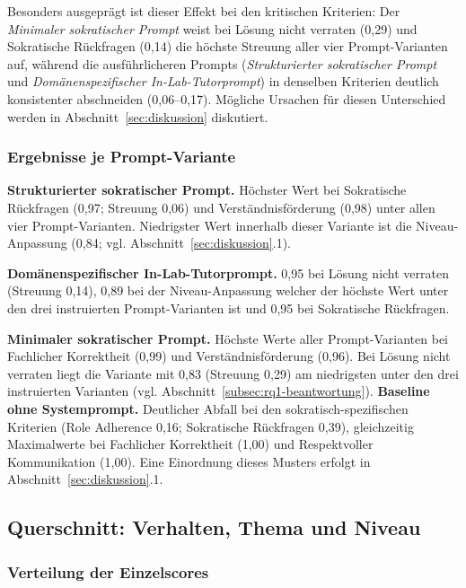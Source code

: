 Besonders ausgeprägt ist dieser Effekt bei den kritischen Kriterien: Der \emph{Minimaler
sokratischer Prompt} weist bei \glqq Lösung nicht verraten\grqq{} (0,29) und \glqq Sokratische
Rückfragen\grqq{} (0,14) die höchste Streuung aller vier Prompt-Varianten auf, während die ausführlicheren
Prompts (\emph{Strukturierter sokratischer Prompt} und \emph{Domänenspezifischer
In-Lab-Tutorprompt}) in denselben Kriterien deutlich konsistenter abschneiden (0,06--0,17). Mögliche
Ursachen für diesen Unterschied werden in Abschnitt~\ref{sec:diskussion} diskutiert.

\subsubsection{Ergebnisse je Prompt-Variante}

\textbf{Strukturierter sokratischer Prompt.} Höchster Wert bei Sokratische Rückfragen (0,97; Streuung 0,06) und Verständnisförderung (0,98) unter allen vier  Prompt-Varianten. Niedrigster Wert innerhalb dieser Variante ist die Niveau-Anpassung (0,84; vgl. Abschnitt~\ref{sec:diskussion}.1).

\textbf{Domänenspezifischer In-Lab-Tutorprompt.} 0,95 bei \glqq Lösung nicht verraten\grqq{} (Streuung 0,14), 0,89 bei der Niveau-Anpassung welcher der höchste Wert unter den drei instruierten Prompt-Varianten ist und 0,95 bei Sokratische Rückfragen.

\textbf{Minimaler sokratischer Prompt.} Höchste Werte aller  Prompt-Varianten bei Fachlicher Korrektheit (0,99) und Verständnisförderung (0,96). Bei \glqq Lösung nicht verraten\grqq{} liegt die Variante mit 0,83 (Streuung 0,29) am niedrigsten unter den drei instruierten Varianten (vgl. Abschnitt~\ref{subsec:rq1-beantwortung}). 
\textbf{Baseline ohne Systemprompt.} Deutlicher Abfall bei den sokratisch-spezifischen Kriterien (Role Adherence 0,16; Sokratische Rückfragen 0,39), gleichzeitig Maximalwerte bei Fachlicher Korrektheit (1,00) und Respektvoller Kommunikation (1,00). Eine Einordnung dieses Musters erfolgt in Abschnitt~\ref{sec:diskussion}.1.

\subsection{Querschnitt: Verhalten, Thema und Niveau}
\label{subsec:querschnitt}

\subsubsection{Verteilung der Einzelscores}

